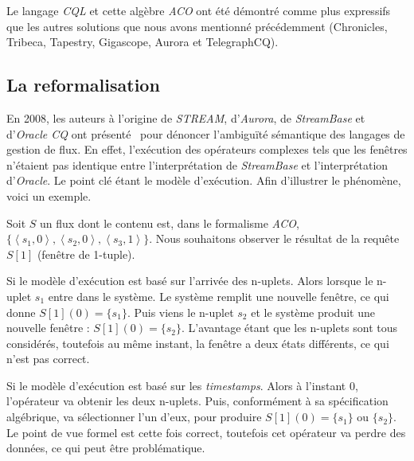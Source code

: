 Le langage \textit{CQL} et cette algèbre \textit{ACO} ont été démontré comme plus expressifs~\cite{Arasu:cql} que les autres solutions que nous avons mentionné précédemment (Chronicles, Tribeca, Tapestry, Gigascope, Aurora et TelegraphCQ).

\subsection{La reformalisation}
En 2008, les auteurs à l'origine de \textit{STREAM}, d'\textit{Aurora}, de \textit{StreamBase} et d'\textit{Oracle CQ} ont présenté~\cite{Jain:spread} pour dénoncer l'ambiguïté sémantique des langages de gestion de flux. En effet, l'exécution des opérateurs complexes tels que les fenêtres n'étaient pas identique entre l'interprétation de \textit{StreamBase} et l'interprétation d'\textit{Oracle}. Le point clé étant le modèle d'exécution. Afin d'illustrer le phénomène, voici un exemple.

\begin{example}\label{ex:rw:sgfd:batches}
 Soit $S$ un flux dont le contenu est, dans le formalisme \textit{ACO}, $\{\left<s_1,0\right>, \left<s_2,0\right>, \left<s_3,1\right>\}$. Nous souhaitons observer le résultat de la requête $S[1]$ (fenêtre de 1-tuple).

Si le modèle d'exécution est basé sur l'arrivée des n-uplets. Alors lorsque le n-uplet $s_1$ entre dans le système. Le système remplit une nouvelle fenêtre, ce qui donne $S[1](0)=\{s_1\}$. Puis viens le n-uplet $s_2$ et le système produit une nouvelle fenêtre : $S[1](0)=\{s_2\}$. L'avantage étant que les n-uplets sont tous considérés, toutefois au même instant, la fenêtre a deux états différents, ce qui n'est pas correct.

Si le modèle d'exécution est basé sur les \textit{timestamps}. Alors à l'instant 0, l'opérateur va obtenir les deux n-uplets. Puis, conformément à sa spécification algébrique, va sélectionner l'un d'eux, pour produire $S[1](0) = \{s_1\}$ ou $\{s_2\}$. Le point de vue formel est cette fois correct, toutefois cet opérateur va perdre des données, ce qui peut être problématique.
\end{example}

